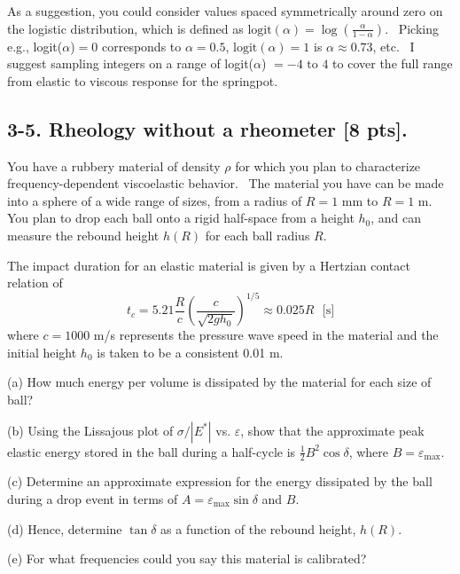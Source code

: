 \documentclass[preprint,12pt,authoryear]{elsarticle}
\begin{document}
As a suggestion, you could consider values spaced symmetrically around zero on the logistic distribution, which is defined as $\textrm{logit}(\alpha) = \log\left(\frac{\alpha}{1-\alpha} \right)$. 
Picking e.g., logit($\alpha$)$=0$ corresponds to $\alpha =0.5$, $\textrm{logit}(\alpha) =  1$ is $\alpha\approx0.73$, etc. 
I suggest sampling integers on a range of logit($\alpha$) $= -4 \textrm{~to~} 4$ to cover the full range from elastic to viscous response for the springpot.

\bigskip
\bigskip
\subsection*{3-5. \textbf{Rheology without a rheometer} [8 pts].}

You have a rubbery material of density $\rho$ for which you plan to characterize frequency-dependent viscoelastic behavior. 
The material you have can be made into a sphere of a wide range of sizes, from a radius of $R=1$ mm to $R=1$ m. 
You plan to drop each ball onto a rigid half-space from a height $h_0$, and can measure the rebound height $h(R)$ for each ball radius $R$. 

The impact duration for an elastic material is given by a Hertzian contact relation of
\begin{equation*}
    t_c = 5.21\frac{R}{c}\left(\frac{c}{\sqrt{2 g h_0}}\right)^{1/5} \approx 0.025R  \textrm{~~[s]}
\end{equation*}
where $c = 1000$ m/s represents the pressure wave speed in the material and the initial height $h_0$ is taken to be a consistent 0.01 m.

(a) How much energy per volume is dissipated by the material for each size of ball? 

(b) Using the Lissajous plot of $\sigma/|E^*|$ vs. $\varepsilon$, show that the approximate peak elastic energy stored in the ball during a half-cycle is $\frac{1}{2} B^2 \cos \delta$, where $B = \varepsilon_{\textrm{max}}$. 

(c) Determine an approximate expression for the energy dissipated by the ball during a drop event in terms of $A = \varepsilon_{\textrm{max}} \sin \delta$ and $B$. 

(d) Hence, determine $\tan\delta$ as a function of the rebound height, $h(R)$. 

(e) For what frequencies could you say this material is calibrated?


 

\end{document}
